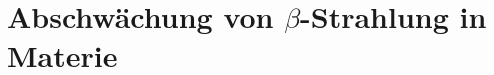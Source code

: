 \documentclass[../protokoll.tex]{subfiles}
\begin{document}
\section{Abschwächung von $\beta$-Strahlung in Materie}\label{sec:Abschwächung Beta-Strahlung}
\end{document}
